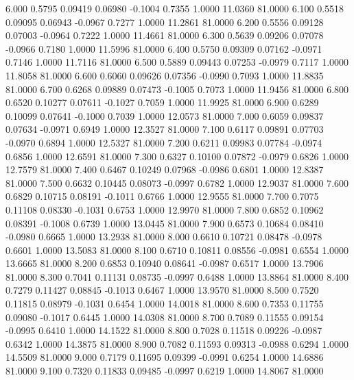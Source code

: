    6.000   0.5795   0.09419   0.06980  -0.1004   0.7355   1.0000  11.0360  81.0000
   6.100   0.5518   0.09095   0.06943  -0.0967   0.7277   1.0000  11.2861  81.0000
   6.200   0.5556   0.09128   0.07003  -0.0964   0.7222   1.0000  11.4661  81.0000
   6.300   0.5639   0.09206   0.07078  -0.0966   0.7180   1.0000  11.5996  81.0000
   6.400   0.5750   0.09309   0.07162  -0.0971   0.7146   1.0000  11.7116  81.0000
   6.500   0.5889   0.09443   0.07253  -0.0979   0.7117   1.0000  11.8058  81.0000
   6.600   0.6060   0.09626   0.07356  -0.0990   0.7093   1.0000  11.8835  81.0000
   6.700   0.6268   0.09889   0.07473  -0.1005   0.7073   1.0000  11.9456  81.0000
   6.800   0.6520   0.10277   0.07611  -0.1027   0.7059   1.0000  11.9925  81.0000
   6.900   0.6289   0.10099   0.07641  -0.1000   0.7039   1.0000  12.0573  81.0000
   7.000   0.6059   0.09837   0.07634  -0.0971   0.6949   1.0000  12.3527  81.0000
   7.100   0.6117   0.09891   0.07703  -0.0970   0.6894   1.0000  12.5327  81.0000
   7.200   0.6211   0.09983   0.07784  -0.0974   0.6856   1.0000  12.6591  81.0000
   7.300   0.6327   0.10100   0.07872  -0.0979   0.6826   1.0000  12.7579  81.0000
   7.400   0.6467   0.10249   0.07968  -0.0986   0.6801   1.0000  12.8387  81.0000
   7.500   0.6632   0.10445   0.08073  -0.0997   0.6782   1.0000  12.9037  81.0000
   7.600   0.6829   0.10715   0.08191  -0.1011   0.6766   1.0000  12.9555  81.0000
   7.700   0.7075   0.11108   0.08330  -0.1031   0.6753   1.0000  12.9970  81.0000
   7.800   0.6852   0.10962   0.08391  -0.1008   0.6739   1.0000  13.0445  81.0000
   7.900   0.6573   0.10684   0.08410  -0.0980   0.6665   1.0000  13.2938  81.0000
   8.000   0.6610   0.10721   0.08478  -0.0978   0.6601   1.0000  13.5083  81.0000
   8.100   0.6710   0.10811   0.08556  -0.0981   0.6554   1.0000  13.6665  81.0000
   8.200   0.6853   0.10940   0.08641  -0.0987   0.6517   1.0000  13.7906  81.0000
   8.300   0.7041   0.11131   0.08735  -0.0997   0.6488   1.0000  13.8864  81.0000
   8.400   0.7279   0.11427   0.08845  -0.1013   0.6467   1.0000  13.9570  81.0000
   8.500   0.7520   0.11815   0.08979  -0.1031   0.6454   1.0000  14.0018  81.0000
   8.600   0.7353   0.11755   0.09080  -0.1017   0.6445   1.0000  14.0308  81.0000
   8.700   0.7089   0.11555   0.09154  -0.0995   0.6410   1.0000  14.1522  81.0000
   8.800   0.7028   0.11518   0.09226  -0.0987   0.6342   1.0000  14.3875  81.0000
   8.900   0.7082   0.11593   0.09313  -0.0988   0.6294   1.0000  14.5509  81.0000
   9.000   0.7179   0.11695   0.09399  -0.0991   0.6254   1.0000  14.6886  81.0000
   9.100   0.7320   0.11833   0.09485  -0.0997   0.6219   1.0000  14.8067  81.0000

